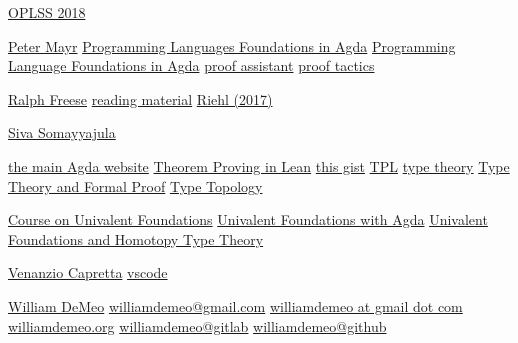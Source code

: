 \href{https://www.cs.uoregon.edu/research/summerschool/summer18/topics.php#Bauer}{OPLSS 2018}

\href{http://math.colorado.edu/~mayr/}{Peter Mayr}
\href{https://plfa.github.io/}{Programming Languages Foundations in Agda}
\href{https://plfa.github.io/}{Programming Language Foundations in Agda}
\href{https://en.wikipedia.org/wiki/Proof_assistant}{proof assistant}
\href{https://en.wikipedia.org/wiki/Tactic_(proof_assistant)}{proof tactics}

\href{https://math.hawaii.edu/~ralph/}{Ralph Freese}
\href{https://arxiv.org/abs/1807.05923}{reading material}
\href{http://www.math.jhu.edu/~eriehl/context/}{Riehl (2017)}

\href{http://www.cs.cmu.edu/~ssomayya/}{Siva Somayyajula}

\href{https://wiki.portal.chalmers.se/agda/pmwiki.php}{the main Agda website}
\href{https://leanprover.github.io/theorem_proving_in_lean/index.html}{Theorem Proving in Lean}
\href{https://gist.github.com/andrejbauer/3cc438ab38646516e5e9278fdb22022c}{this gist}
\href{https://leanprover.github.io/theorem_proving_in_lean/}{TPL}
\href{https://en.wikipedia.org/wiki/Type_theory}{type theory}
\href{https://www.cambridge.org/vi/academic/subjects/computer-science/programming-languages-and-applied-logic/type-theory-and-formal-proof-introduction}{Type Theory and Formal Proof}
\href{https://github.com/martinescardo/TypeTopology}{Type Topology}

\href{https://www.cs.bham.ac.uk/~mhe/HoTT-UF-in-Agda-Lecture-Notes}{Course on Univalent Foundations}
\href{https://www.cs.bham.ac.uk/~mhe/HoTT-UF-in-Agda-Lecture-Notes}{Univalent Foundations with Agda}
\href{https://www.cs.bham.ac.uk/~mhe/HoTT-UF-in-Agda-Lecture-Notes}{Univalent Foundations and Homotopy Type Theory}

\href{https://www.duplavis.com/venanzio/}{Venanzio Capretta}
\href{https://code.visualstudio.com/}{vscode}

\href{https://williamdemeo.gitlab.io/}{William DeMeo}
\href{mailto:williamdemeo@gmail.com}{williamdemeo@gmail.com}
\href{mailto:williamdemeo@gmail.com}{williamdemeo at gmail dot com}
\href{https://williamdemeo.gitlab.io/}{williamdemeo.org}
\href{https://gitlab.com/williamdemeo}{williamdemeo@gitlab}
\href{https://github.com/williamdemeo}{williamdemeo@github}

